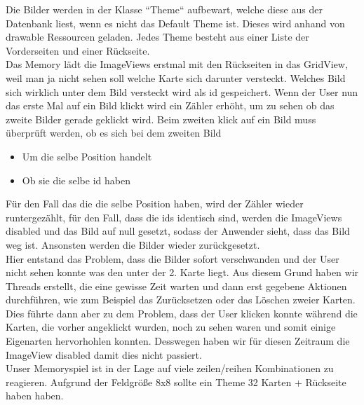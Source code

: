 \documentclass[11pt,a4paper]{article}
\begin{document}
Die Bilder werden in der Klasse ``Theme`` aufbewart, welche diese aus der Datenbank liest, wenn es nicht das Default Theme ist. Dieses wird anhand von drawable Ressourcen geladen. Jedes Theme besteht aus einer Liste der Vorderseiten und einer Rückseite. \\

Das Memory lädt die ImageViews erstmal mit den Rückseiten in das GridView, weil man ja nicht sehen soll welche Karte sich darunter versteckt. Welches Bild sich wirklich unter dem Bild versteckt wird als id gespeichert. Wenn der User nun das erste Mal auf ein Bild klickt wird ein Zähler erhöht, um zu sehen ob das zweite Bilder gerade geklickt wird. Beim zweiten klick auf ein Bild  muss überprüft werden, ob es sich bei dem zweiten Bild

\begin{itemize}
	\item Um die selbe Position handelt 
	\item Ob sie die selbe id haben
\end{itemize}
	
Für den Fall das die die selbe Position haben, wird der Zähler wieder runtergezählt, für den Fall, dass die ids identisch sind, werden die ImageViews disabled und das Bild auf null gesetzt, sodass der Anwender sieht, dass das Bild weg ist. Ansonsten werden die Bilder wieder zurückgesetzt. \\

Hier entstand das Problem, dass die Bilder sofort verschwanden und der User nicht sehen konnte was den unter der 2. Karte liegt. Aus diesem Grund haben wir Threads erstellt, die eine gewisse Zeit warten und dann erst gegebene Aktionen durchführen, wie zum Beispiel das Zurücksetzen oder das Löschen zweier Karten. \\

Dies führte dann aber zu dem Problem, dass der User klicken konnte während die Karten, die vorher angeklickt wurden, noch zu sehen waren und somit einige Eigenarten hervorhohlen konnten. Desswegen haben wir für diesen Zeitraum die ImageView disabled damit dies nicht passiert.\\

Unser Memoryspiel ist in der Lage auf viele zeilen/reihen 
Kombinationen zu reagieren. Aufgrund der Feldgröße 8x8 sollte ein 
Theme 32 Karten + Rückseite haben haben.  \\
\end{document}
